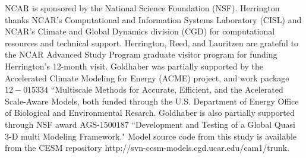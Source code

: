 \documentclass[twocol]{ametsoc}
\begin{document}
%
\acknowledgments
NCAR is sponsored by the National Science Foundation (NSF). Herrington thanks NCAR's Computational and Information Systems Laboratory (CISL) and NCAR's Climate and Global Dynamics division (CGD) for computational resources and technical support. Herrington, Reed, and Lauritzen are grateful to the NCAR Advanced Study Program graduate visitor program for funding Herrington's 12-month visit. Goldhaber was partially supported by the Accelerated Climate Modeling for Energy (ACME) project, and work package $12-015334$ ``Multiscale Methods for Accurate, Efficient, and the Acelerated Scale-Aware Models, both funded through the U.S. Department of Energy Office of Biological and Environmental Resarch. Goldhaber is also partially supported through NSF award AGS-$1500187$ ``Development and Testing of a Global Quasi 3-D multi Modeling Framework." Model source code from this study is available from the CESM repository http://svn-ccsm-models.cgd.ucar.edu/cam1/trunk.
\end{document}
